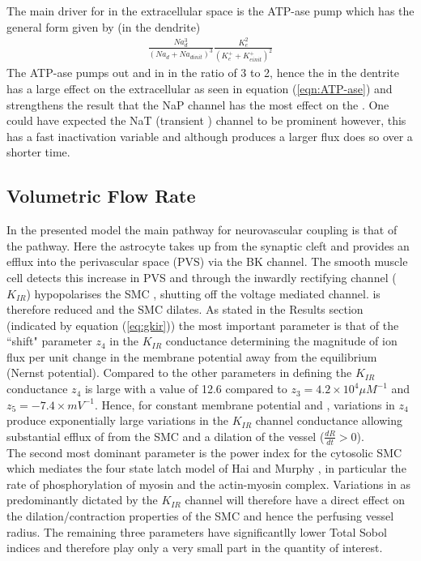 The main driver for \pot in the extracellular space is the \pot \na ATP-ase pump which has the general form given by (in the dendrite)  
\begin{eqnarray}\label{eqn:ATP-ase}
\frac{Na_d^3}{\left( Na_d+Na_{d init}\right)^3}\frac{K^{2}_e}{\left( K^+_e +K^+_{e init}\right) ^2}
\end{eqnarray}
The ATP-ase pumps out \na and in \pot in the ratio of 3 to 2, hence the \na in the dentrite has a large effect on the extracellular \pot as seen in equation (\ref{eqn:ATP-ase}) and strengthens the result that the NaP channel has the most effect on the \pot. One could have expected the NaT (transient \na) channel to be prominent however, this has a fast inactivation variable and although produces a larger flux does so over a shorter time.  
\subsection{Volumetric Flow Rate}
In the presented model the main pathway for neurovascular coupling is that of the \pot pathway. Here the astrocyte takes up \pot from the synaptic cleft and provides an efflux into the perivascular space (PVS) via the BK channel. The smooth muscle cell detects this increase in PVS \pot and through the inwardly rectifying channel ($K_{IR}$) hypopolarises the SMC , shutting off the voltage mediated \ca channel.  \ca is therefore reduced and the SMC dilates. As stated in the Results section (indicated by equation (\ref{eq:gkir})) the most important parameter is that of the ``shift" parameter $z_4$ in the $K_{IR}$ conductance determining the magnitude of ion flux per unit change in the membrane potential away from the equilibrium (Nernst potential).  Compared to the other parameters in defining the $K_{IR}$ conductance $z_4$ is large with a value of 12.6 compared to $z_3=4.2 \times 10^{4} \mu M^{-1}$ and $z_5 = -7.4 \times mV^{-1}$. Hence, for constant membrane potential and \pot,   variations in $z_4$ produce exponentially large variations in the $K_{IR}$ channel conductance allowing substantial efflux of \ca from the SMC and a dilation of the vessel ($\frac{dR}{dt}> 0$). \\

The second most dominant parameter is the power index for the cytosolic SMC \ca which mediates the four state latch model of Hai and Murphy \cite{Hai1988}, in particular the rate of phosphorylation of  myosin and the actin-myosin complex.  Variations in \ca as predominantly dictated by the $K_{IR}$ channel will therefore have a direct effect on the dilation/contraction properties of the SMC and hence the perfusing vessel radius.  
The remaining three parameters have significantlly lower Total Sobol indices and therefore play only a very small part in the quantity of interest.\\
 
